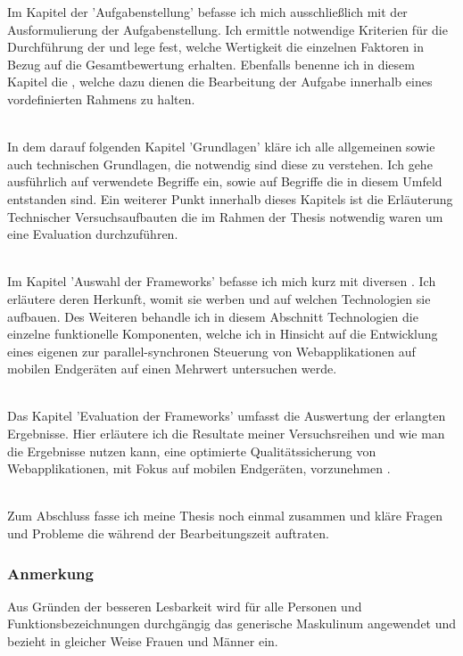 \pagebreak
Im Kapitel der 'Aufgabenstellung' befasse ich mich ausschließlich mit der Ausformulierung der Aufgabenstellung. Ich ermittle notwendige Kriterien für die Durchführung der  und lege fest, welche Wertigkeit die einzelnen Faktoren in Bezug auf die Gesamtbewertung erhalten. Ebenfalls benenne ich in diesem Kapitel die , welche dazu dienen die Bearbeitung der Aufgabe innerhalb eines vordefinierten Rahmens zu halten.

\\In dem darauf folgenden Kapitel 'Grundlagen' kläre ich alle allgemeinen sowie auch technischen Grundlagen, die notwendig sind diese  zu verstehen. Ich gehe ausführlich auf verwendete Begriffe ein, sowie auf Begriffe die in diesem Umfeld entstanden sind. Ein weiterer Punkt innerhalb dieses Kapitels ist die Erläuterung Technischer Versuchsaufbauten die im Rahmen der Thesis notwendig waren um eine Evaluation durchzuführen.

\\Im Kapitel 'Auswahl der Frameworks' befasse ich mich kurz mit diversen . Ich erläutere deren Herkunft, womit sie werben und auf welchen Technologien sie aufbauen. Des Weiteren behandle ich in diesem Abschnitt Technologien die einzelne funktionelle Komponenten, welche ich in Hinsicht auf die Entwicklung eines eigenen  zur parallel-synchronen Steuerung von Webapplikationen auf mobilen Endgeräten auf einen Mehrwert untersuchen werde.

\\Das Kapitel 'Evaluation der Frameworks' umfasst die Auswertung der erlangten Ergebnisse. Hier erläutere ich die Resultate meiner Versuchsreihen und wie man die Ergebnisse nutzen kann, eine optimierte Qualitätssicherung von Webapplikationen, mit Fokus auf mobilen Endgeräten, vorzunehmen .

\\Zum Abschluss fasse ich meine Thesis noch einmal zusammen und kläre Fragen und Probleme die während der Bearbeitungszeit auftraten.

\vfill
\subsubsection{Anmerkung}
Aus Gründen der besseren Lesbarkeit wird für alle Personen und Funktionsbezeichnungen durchgängig das generische Maskulinum angewendet und bezieht in gleicher Weise Frauen und Männer ein.